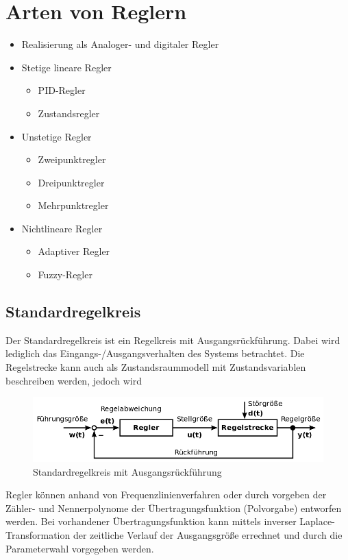 \section{Arten von Reglern}
	\begin{itemize}
		\item Realisierung als Analoger- und digitaler Regler
		\item Stetige lineare Regler
		\begin{itemize}
			\item PID-Regler
			\item Zustandsregler
		\end{itemize}
		\item Unstetige Regler
		\begin{itemize}
			\item Zweipunktregler
			\item Dreipunktregler
			\item Mehrpunktregler
		\end{itemize}
		\item Nichtlineare Regler
		\begin{itemize}
			\item Adaptiver Regler
			\item Fuzzy-Regler
		\end{itemize}
	\end{itemize}
	\subsection{Standardregelkreis}
		Der Standardregelkreis ist ein Regelkreis mit Ausgangsrückführung. Dabei wird lediglich das Eingangs-/Ausgangsverhalten des Systems betrachtet. Die Regelstrecke kann auch als Zustandsraummodell mit Zustandsvariablen beschreiben werden, jedoch wird
		\begin{figure}[h]
			\centering
			\includegraphics[width=0.7\linewidth]{./pics/re/std}
			\caption{Standardregelkreis mit Ausgangsrückführung}
		\end{figure}
		Regler können anhand von Frequenzlinienverfahren oder durch vorgeben der Zähler- und Nennerpolynome der Übertragungsfunktion (Polvorgabe) entworfen werden. Bei vorhandener Übertragungsfunktion kann mittels inverser Laplace-Transformation der zeitliche Verlauf der Ausgangsgröße errechnet und durch die Parameterwahl vorgegeben werden. 
